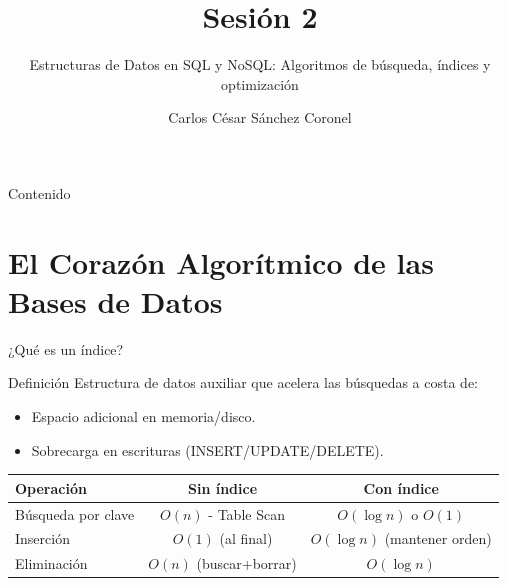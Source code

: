 \documentclass[aspectratio=169, 10pt, xcolor=table]{beamer}
\title[SESIÓN 2 BBDD]{\textbf{Sesión 2}}
\subtitle{Estructuras de Datos en SQL y NoSQL: Algoritmos de búsqueda, índices y optimización}
\author[Prof. C. Sánchez]{Carlos César Sánchez Coronel}
\institute{\textbf{BASES DE DATOS}}
\date{}
\begin{document}
\begin{frame}
    \titlepage
\end{frame}

\begin{frame}{Contenido}
    \tableofcontents
\end{frame}

\section{El Corazón Algorítmico de las Bases de Datos}

\begin{frame}{¿Qué es un índice?}
    \begin{block}{Definición}
        Estructura de datos auxiliar que acelera las búsquedas a costa de:
        \begin{itemize}
            \item Espacio adicional en memoria/disco.
            \item Sobrecarga en escrituras (INSERT/UPDATE/DELETE).
        \end{itemize}
    \end{block}
    \vspace{0.3cm}
    \begin{table}
        \centering
        \begin{tabular}{lcc}
            \toprule
            \textbf{Operación} & \textbf{Sin índice} & \textbf{Con índice} \\
            \midrule
            Búsqueda por clave & $O(n)$ - Table Scan & $O(\log n)$ o $O(1)$ \\
            Inserción           & $O(1)$ (al final)    & $O(\log n)$ (mantener orden) \\
            Eliminación         & $O(n)$ (buscar+borrar) & $O(\log n)$ \\
            \bottomrule
        \end{tabular}
    \end{table}
\end{frame}

\end{document}
